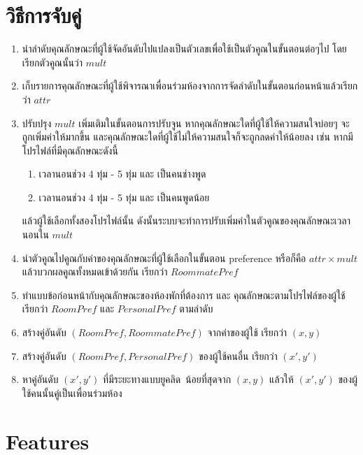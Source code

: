 \section{วิธีการจับคู่}
\begin{enumerate}
  \item นำลำดับคุณลักษณะที่ผู้ใช้จัดอันดับไปแปลงเป็นตัวเลขเพื่อใช้เป็นตัวคูณในขั้นตอนต่อๆไป โดยเรียกตัวคูณนั้นว่า $mult$
  \item เก็บรายการคุณลักษณะที่ผู้ใช้พิจารณาเพื่อนร่วมห้องจากการจัดลำดับในขั้นตอนก่อนหน้าแล้วเรียกว่า $attr$
  \item ปรับปรุง $mult$ เพิ่มเติมในขั้นตอนการปรับจูน หากคุณลักษณะใดที่ผู้ใช้ให้ความสนใจบ่อยๆ จะถูกเพิ่มค่าให้มากขึ้น และคุณลักษณะใดที่ผู้ใช้ไม่ให้ความสนใจก็จะถูกลดค่าให้น้อยลง 
        เช่น หากมีโปรไฟล์ที่มีคุณลักษณะดังนี้
        \begin{enumerate}
          \item เวลานอนช่วง 4 ทุ่ม - 5 ทุ่ม และ เป็นคนช่างพูด  
          \item เวลานอนช่วง 4 ทุ่ม - 5 ทุ่ม และ เป็นคนพูดน้อย  
        \end{enumerate} 
        แล้วผู้ใช้เลือกทั้งสองโปรไฟล์นั้น ดังนั้นระบบจะทำการปรับเพิ่มค่าในตัวคูณของคุณลักษณะเวลานอนใน $mult$
  \item นำตัวคูณไปคูณกับค่าของคุณลักษณะที่ผู้ใช้เลือกในขั้นตอน preference หรือก็คือ $attr \times mult$ แล้วบวกผลคูณทั้งหมดเข้าด้วยกัน เรียกว่า $\mathit{RoommatePref}$
  \item ทำแบบข้อก่อนหน้ากับคุณลักษณะของห้องพักที่ต้องการ และ คุณลักษณะตามโปรไฟล์ของผู้ใช้ เรียกว่า $\mathit{RoomPref}$ และ $\mathit{PersonalPref}$ ตามลำดับ
  \item สร้างคู่อันดับ $(\mathit{RoomPref}, \mathit{RoommatePref})$ จากค่าของผู้ใช้ เรียกว่า $(x,y)$ 
  \item สร้างคู่อันดับ $(\mathit{RoomPref}, \mathit{PersonalPref})$ ของผู้ใช้คนอื่น เรียกว่า $(x',y')$
  \item หาคู่อันดับ $(x',y')$ ที่มีระยะทางแบบยูคลิด~\cite{euclid-dist}น้อยที่สุดจาก $(x,y)$ แล้วให้ $(x',y')$ ของผู้ใช้คนนั้นคู่เป็นเพื่อนร่วมห้อง
\end{enumerate}

\section{Features}
